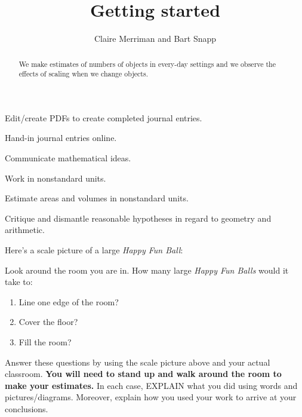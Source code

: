 \documentclass[handout,noauthor,nooutcomes,hints,12pt]{ximera}
\title{Getting started}
\author{Claire Merriman and Bart Snapp}
\begin{document}
\begin{abstract}
  We make estimates of numbers of objects in every-day settings and we
  observe the effects of scaling when we change objects.
\end{abstract}
\maketitle


\begin{listOutcomes}
  \item{Edit/create PDFs to create completed journal entries.}
  \item{Hand-in journal entries online.}
  \item{Communicate mathematical ideas.}
  \item{Work in nonstandard units.}
  \item{Estimate areas and volumes in nonstandard units.}
  \item{Critique and dismantle reasonable hypotheses in regard to geometry and
              arithmetic.}
\end{listOutcomes}

\mynewpage

\begin{question}
  Here's a scale picture of a large \textit{Happy Fun Ball}:
  \begin{center}
  \end{center}
  Look around the room you are in. How many large \textit{Happy Fun Balls}
  would it take to:
  \begin{enumerate}
    \item Line one edge of the room?
    \item Cover the floor?
    \item Fill the room?
  \end{enumerate}
  Answer these questions by using the scale picture above and your actual classroom. \textbf{You will need to stand up and walk around the room to make your estimates.}
  In each case, EXPLAIN what you did using words and pictures/diagrams. Moreover, explain how you used your work to arrive at your conclusions.
\end{question}
\mynewpage
\end{document}
